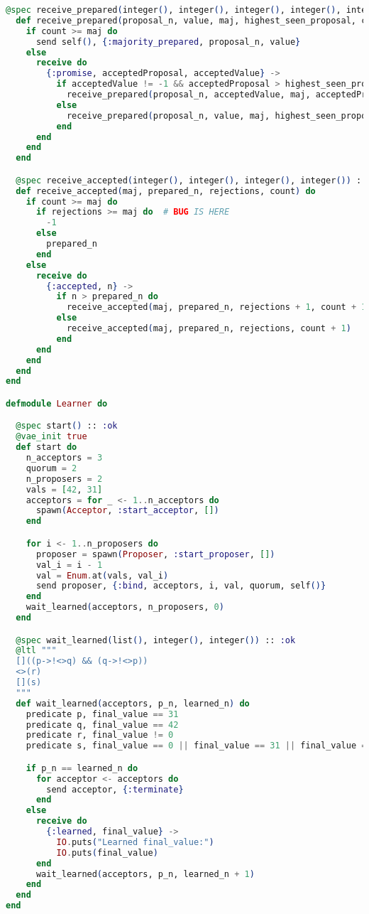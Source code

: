 \begin{lstlisting}[language=Elixir, xleftmargin=.1\linewidth]
  @spec receive_prepared(integer(), integer(), integer(), integer(), integer()) :: :ok
  def receive_prepared(proposal_n, value, maj, highest_seen_proposal, count) do
    if count >= maj do
      send self(), {:majority_prepared, proposal_n, value}
    else
      receive do
        {:promise, acceptedProposal, acceptedValue} ->
          if acceptedValue != -1 && acceptedProposal > highest_seen_proposal do
            receive_prepared(proposal_n, acceptedValue, maj, acceptedProposal, count + 1)
          else
            receive_prepared(proposal_n, value, maj, highest_seen_proposal, count + 1)
          end
      end
    end
  end

  @spec receive_accepted(integer(), integer(), integer(), integer()) :: integer()
  def receive_accepted(maj, prepared_n, rejections, count) do
    if count >= maj do
      if rejections >= maj do  # BUG IS HERE
        -1
      else
        prepared_n
      end
    else
      receive do
        {:accepted, n} ->
          if n > prepared_n do
            receive_accepted(maj, prepared_n, rejections + 1, count + 1)
          else
            receive_accepted(maj, prepared_n, rejections, count + 1)
          end
      end
    end
  end
end

defmodule Learner do

  @spec start() :: :ok
  @vae_init true
  def start do
    n_acceptors = 3
    quorum = 2
    n_proposers = 2
    vals = [42, 31]
    acceptors = for _ <- 1..n_acceptors do
      spawn(Acceptor, :start_acceptor, [])
    end

    for i <- 1..n_proposers do
      proposer = spawn(Proposer, :start_proposer, [])
      val_i = i - 1
      val = Enum.at(vals, val_i)
      send proposer, {:bind, acceptors, i, val, quorum, self()}
    end
    wait_learned(acceptors, n_proposers, 0)
  end

  @spec wait_learned(list(), integer(), integer()) :: :ok
  @ltl """
  []((p->!<>q) && (q->!<>p))
  <>(r)
  [](s)
  """
  def wait_learned(acceptors, p_n, learned_n) do
    predicate p, final_value == 31
    predicate q, final_value == 42
    predicate r, final_value != 0
    predicate s, final_value == 0 || final_value == 31 || final_value == 42

    if p_n == learned_n do
      for acceptor <- acceptors do
        send acceptor, {:terminate}
      end
    else
      receive do
        {:learned, final_value} ->
          IO.puts("Learned final_value:")
          IO.puts(final_value)
      end
      wait_learned(acceptors, p_n, learned_n + 1)
    end
  end
end

\end{lstlisting}

